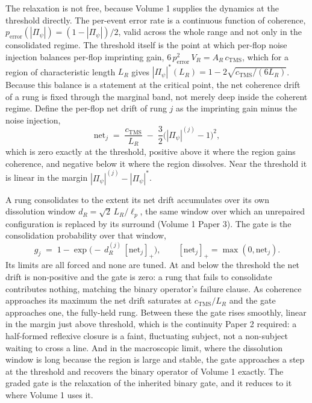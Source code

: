 \documentclass[11pt,oneside]{report}
\theoremstyle{definition}
\theoremstyle{remark}
\begin{document}
The relaxation is not free, because Volume 1 supplies the dynamics at the
threshold directly. The per-event error rate is a continuous function of
coherence, \ensuremath{p_{\mathrm{error}}(|\Pi_{\psi}|) = (1 - |\Pi_{\psi}|)/2},
valid across the whole range and not only in the consolidated regime. The
threshold itself is the point at which per-flop noise injection balances
per-flop imprinting gain, \ensuremath{6\,p_{\mathrm{error}}^{2}\,V_{R} = A_{R}\,c_{\mathrm{TMS}}},
which for a region of characteristic length \ensuremath{L_{R}} gives
\ensuremath{|\Pi_{\psi}|^{*}(L_{R}) = 1 - 2\sqrt{c_{\mathrm{TMS}}/(6L_{R})}}.
Because this balance is a statement at the critical point, the net coherence
drift of a rung is fixed through the marginal band, not merely deep inside the
coherent regime. Define the per-flop net drift of rung \ensuremath{j} as the
imprinting gain minus the noise injection,
\[
\mathrm{net}_{j} \;=\; \frac{c_{\mathrm{TMS}}}{L_{R}} \;-\; \frac{3}{2}\bigl(|\Pi_{\psi}|^{(j)} - 1\bigr)^{2},
\]
which is zero exactly at the threshold, positive above it where the region
gains coherence, and negative below it where the region dissolves. Near the
threshold it is linear in the margin \ensuremath{|\Pi_{\psi}|^{(j)} - |\Pi_{\psi}|^{*}}.

A rung consolidates to the extent its net drift accumulates over its own
dissolution window \ensuremath{d_{R} = \sqrt{2}\,L_{R}/\ell_{p}}, the same
window over which an unrepaired configuration is replaced by its surround
(Volume 1 Paper 3). The gate is the consolidation probability over that
window,
\[
g_{j} \;=\; 1 - \exp\!\bigl(-\,d_{R}^{(j)}\,[\mathrm{net}_{j}]_{+}\bigr),
\qquad [\mathrm{net}_{j}]_{+} = \max(0, \mathrm{net}_{j}).
\]
Its limits are all forced and none are tuned. At and below the threshold the
net drift is non-positive and the gate is zero: a rung that fails to
consolidate contributes nothing, matching the binary operator's failure
clause. As coherence approaches its maximum the net drift saturates at
\ensuremath{c_{\mathrm{TMS}}/L_{R}} and the gate approaches one, the
fully-held rung. Between these the gate rises smoothly, linear in the margin
just above threshold, which is the continuity Paper 2 required: a half-formed
reflexive closure is a faint, fluctuating subject, not a non-subject waiting
to cross a line. And in the macroscopic limit, where the dissolution window is
long because the region is large and stable, the gate approaches a step at the
threshold and recovers the binary operator of Volume 1 exactly. The graded
gate is the relaxation of the inherited binary gate, and it reduces to it
where Volume 1 uses it.
\end{document}
